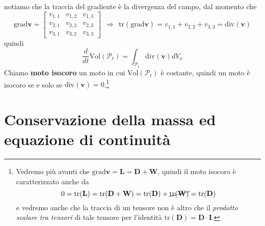 \documentclass[10pt,a4paper,twoside]{book}
\begin{document}
notiamo che la traccia del gradiente è la divergenza del campo, dal momento che
\begin{equation*}
\mathrm{grad}\mathbf{v} =\begin{bmatrix}
v_{1,1} & v_{1,2} & v_{1,3}\\
v_{2,1} & v_{2,2} & v_{2,3}\\
v_{3,1} & v_{3,2} & v_{3,3}
\end{bmatrix} \ \ \Rightarrow \ \ \mathrm{tr}(\mathrm{grad}\mathbf{v}) =v_{1,1} +v_{2,2} +v_{3,3} =\mathrm{div}(\mathbf{v})
\end{equation*}
quindi
\begin{equation*}
\boxed{\frac{d}{dt}\mathrm{Vol}(\mathcal{P}_{t}) =\int _{\mathcal{P}_{t}}\mathrm{div}(\mathbf{v}) dV_{x}}
\end{equation*}
Chiamo \textbf{moto isocoro} un moto in cui $\mathrm{Vol}(\mathcal{P}_{t})$ è costante, quindi un moto è isocoro se e solo se $\mathrm{div}(\mathbf{v}) =0$.\footnote{Vedremo più avanti che $\mathrm{grad}\mathbf{v} =\mathbf{L} =\mathbf{D} +\mathbf{W}$, quindi il moto isocoro è caratterizzato anche da
\begin{equation*}
0=\mathrm{tr}(\mathbf{L}) =\mathrm{tr}(\mathbf{D} +\mathbf{W}) =\mathrm{tr}(\mathbf{D}) +\cancel{\mathrm{tr}(\mathbf{W})} =\mathrm{tr}(\mathbf{D})
\end{equation*}
e vedremo anche che la traccia di un tensore non è altro che il \textit{prodotto scalare tra tensori} di tale tensore per l'identità $\mathrm{tr}(\mathbf{D}) =\mathbf{D} \cdotp \mathbf{I}$.



}
\section{Conservazione della massa ed equazione di continuità}
\end{document}
